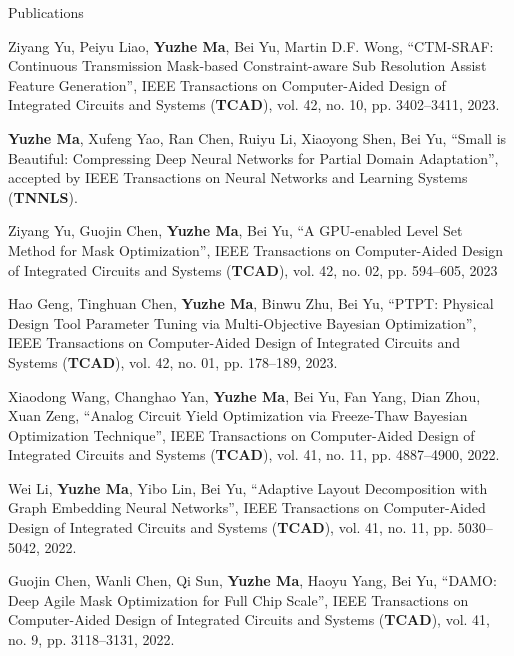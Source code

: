 \begin{rSection}{Publications}
\begin{etaremune}
\item {
    Ziyang Yu, Peiyu Liao, \textbf{Yuzhe Ma}, Bei Yu, Martin D.F. Wong, 
    ``CTM-SRAF: Continuous Transmission Mask-based Constraint-aware Sub Resolution Assist Feature Generation'',
    IEEE Transactions on Computer-Aided Design of Integrated Circuits and Systems (\textbf{TCAD}), vol. 42, no. 10, pp. 3402--3411, 2023. 
}

\item {
    \textbf{Yuzhe Ma}, Xufeng Yao, Ran Chen, Ruiyu Li, Xiaoyong Shen, Bei Yu, 
    ``Small is Beautiful: Compressing Deep Neural Networks for Partial Domain Adaptation'',
    accepted by IEEE Transactions on Neural Networks and Learning Systems (\textbf{TNNLS}).
}

\item {
    Ziyang Yu, Guojin Chen, \textbf{Yuzhe Ma}, Bei Yu, 
    ``A GPU-enabled Level Set Method for Mask Optimization'',
    IEEE Transactions on Computer-Aided Design of Integrated Circuits and Systems (\textbf{TCAD}), vol. 42, no. 02, pp. 594--605, 2023
}

\item {
    Hao Geng, Tinghuan Chen, \textbf{Yuzhe Ma}, Binwu Zhu, Bei Yu, 
    ``PTPT: Physical Design Tool Parameter Tuning via Multi-Objective Bayesian Optimization'',
    IEEE Transactions on Computer-Aided Design of Integrated Circuits and Systems (\textbf{TCAD}), vol. 42, no. 01, pp. 178--189, 2023.
}

\item {
    Xiaodong Wang, Changhao Yan, \textbf{Yuzhe Ma}, Bei Yu, Fan Yang, Dian Zhou, Xuan Zeng, 
    ``Analog Circuit Yield Optimization via Freeze-Thaw Bayesian Optimization Technique'',
    IEEE Transactions on Computer-Aided Design of Integrated Circuits and Systems (\textbf{TCAD}), vol. 41, no. 11, pp. 4887--4900, 2022.
}

\item {
    Wei Li, \textbf{Yuzhe Ma}, Yibo Lin, Bei Yu,
    ``Adaptive Layout Decomposition with Graph Embedding Neural Networks'',
    IEEE Transactions on Computer-Aided Design of Integrated Circuits and Systems (\textbf{TCAD}), vol. 41, no. 11, pp. 5030--5042, 2022.
}

\item {
    Guojin Chen, Wanli Chen, Qi Sun, \textbf{Yuzhe Ma}, Haoyu Yang, Bei Yu,
    ``DAMO: Deep Agile Mask Optimization for Full Chip Scale'',
    IEEE Transactions on Computer-Aided Design of Integrated Circuits and Systems (\textbf{TCAD}), vol. 41, no. 9, pp. 3118--3131, 2022. 
}



\end{etaremune}
\end{rSection}
